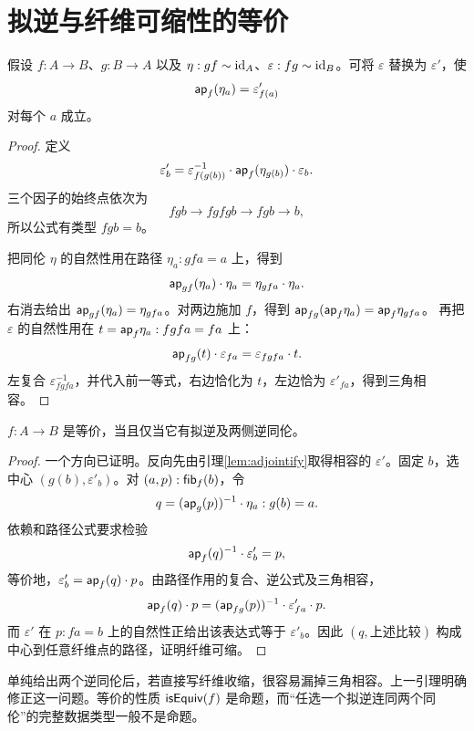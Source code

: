 \section{拟逆与纤维可缩性的等价}
\begin{lemma}[修正余单位]\label{lem:adjointify}
假设 $f:A\to B$、$g:B\to A$ 以及 $\eta:gf\sim\operatorname{id}_A$、$\varepsilon:fg\sim\operatorname{id}_B$。可将 $\varepsilon$ 替换为 $\varepsilon'$，使
\[
\mathsf{ap}_f(\eta_a)=\varepsilon'_{f(a)}
\]
对每个 $a$ 成立。
\end{lemma}
\begin{proof}
定义
\[
\varepsilon'_b
=\varepsilon_{f(g(b))}^{-1}
\cdot\mathsf{ap}_f(\eta_{g(b)})\cdot\varepsilon_b.
\]
三个因子的始终点依次为
\[
fgb\longrightarrow fgfgb\longrightarrow fgb\longrightarrow b,
\]
所以公式有类型 $fgb=b$。

把同伦 $\eta$ 的自然性用在路径 $\eta_a:gfa=a$ 上，得到
\[
\mathsf{ap}_{gf}(\eta_a)\cdot\eta_a=\eta_{gfa}\cdot\eta_a.
\]
右消去给出 $\mathsf{ap}_{gf}(\eta_a)=\eta_{gfa}$。对两边施加 $f$，得到
$\mathsf{ap}_{fg}(\mathsf{ap}_f\eta_a)=\mathsf{ap}_f\eta_{gfa}$。
再把 $\varepsilon$ 的自然性用在 $t=\mathsf{ap}_f\eta_a:fgfa=fa$ 上：
\[
\mathsf{ap}_{fg}(t)\cdot\varepsilon_{fa}=\varepsilon_{fgfa}\cdot t.
\]
左复合 $\varepsilon_{fgfa}^{-1}$，并代入前一等式，右边恰化为 $t$，左边恰为 $\varepsilon'_{fa}$，得到三角相容。
\end{proof}
\begin{theorem}[等价的拟逆判据]\label{thm:equiv-qinv}
$f:A\to B$ 是等价，当且仅当它有拟逆及两侧逆同伦。
\end{theorem}
\begin{proof}
一个方向已证明。反向先由引理\ref{lem:adjointify}取得相容的 $\varepsilon'$。固定 $b$，选中心 $(g(b),\varepsilon'_b)$。对 $(a,p):\mathsf{fib}_f(b)$，令
\[
q=(\mathsf{ap}_g(p))^{-1}\cdot\eta_a:g(b)=a.
\]
依赖和路径公式要求检验
\[
\mathsf{ap}_f(q)^{-1}\cdot\varepsilon'_b=p,
\]
等价地，$\varepsilon'_b=\mathsf{ap}_f(q)\cdot p$。由路径作用的复合、逆公式及三角相容，
\[
\mathsf{ap}_f(q)\cdot p
=(\mathsf{ap}_{fg}(p))^{-1}\cdot\varepsilon'_{fa}\cdot p.
\]
而 $\varepsilon'$ 在 $p:fa=b$ 上的自然性正给出该表达式等于 $\varepsilon'_b$。因此 $(q,\text{上述比较})$ 构成中心到任意纤维点的路径，证明纤维可缩。
\end{proof}
\begin{remark}
单纯给出两个逆同伦后，若直接写纤维收缩，很容易漏掉三角相容。上一引理明确修正这一问题。等价的性质 $\mathsf{isEquiv}(f)$ 是命题，而“任选一个拟逆连同两个同伦”的完整数据类型一般不是命题。
\end{remark}

